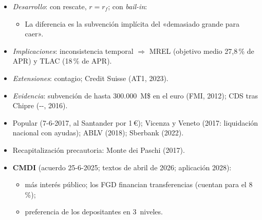 \documentclass{article}
\begin{document}
\begin{columnas}
\begin{itemize}
\item \emph{Desarrollo}: con rescate, $r=r_f$; con \emph{bail-in}:
  \begin{itemize}
  \item La diferencia es la subvención implícita del «demasiado grande para caer».
  \end{itemize}
\item \emph{Implicaciones}: inconsistencia temporal $\Rightarrow$ MREL (objetivo medio 27,8\,\% de APR) y TLAC (18\,\% de APR).
\item \emph{Extensiones}: contagio; Credit Suisse (AT1, 2023).
\item \emph{Evidencia}: subvención de hasta 300.000~M\$ en el euro (FMI, 2012); CDS tras Chipre (--, 2016).
\end{itemize}
\begin{itemize}
\item Popular (7-6-2017, al Santander por 1\,€); Vicenza y Veneto (2017: liquidación nacional con ayudas); ABLV (2018); Sberbank (2022).
\item Recapitalización precautoria: Monte dei Paschi (2017).
\item \textbf{CMDI} (acuerdo 25-6-2025; textos de abril de 2026; aplicación 2028):
  \begin{itemize}
  \item más interés público; los FGD financian transferencias (cuentan para el 8\,\%);
  \item preferencia de los depositantes en 3~niveles.
  \end{itemize}
\end{itemize}


\end{columnas}
\end{document}
